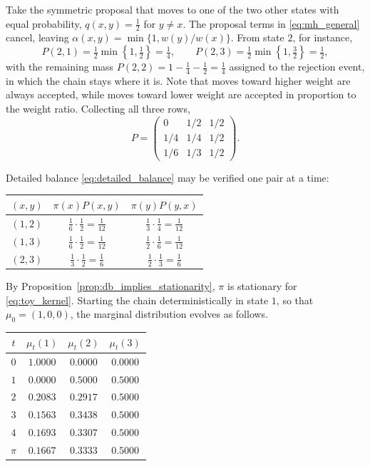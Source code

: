 \documentclass[11pt]{article}
\begin{document}
Take the symmetric proposal that moves to one of the two other states with equal
probability, $q(x,y)=\tfrac{1}{2}$ for $y\neq x$. The proposal terms in
\eqref{eq:mh_general} cancel, leaving $\alpha(x,y)=\min\{1,w(y)/w(x)\}$. From
state $2$, for instance,
\begin{equation*}
    P(2,1)=\tfrac{1}{2}\min\left\{1,\tfrac{1}{2}\right\}=\tfrac{1}{4},
    \qquad
    P(2,3)=\tfrac{1}{2}\min\left\{1,\tfrac{3}{2}\right\}=\tfrac{1}{2},
\end{equation*}
with the remaining mass $P(2,2)=1-\tfrac{1}{4}-\tfrac{1}{2}=\tfrac{1}{4}$
assigned to the rejection event, in which the chain stays where it is. Note that
moves toward higher weight are always accepted, while moves toward lower weight
are accepted in proportion to the weight ratio. Collecting all three rows,
\begin{equation}
    P=\begin{pmatrix}
        0 & 1/2 & 1/2\\
        1/4 & 1/4 & 1/2\\
        1/6 & 1/3 & 1/2
    \end{pmatrix}.
    \label{eq:toy_kernel}
\end{equation}

Detailed balance \eqref{eq:detailed_balance} may be verified one pair at a time:

\begin{center}
\begin{tabular}{ccc}
\toprule
$(x,y)$ & $\pi(x)P(x,y)$ & $\pi(y)P(y,x)$\\
\midrule
$(1,2)$ & $\tfrac{1}{6}\cdot\tfrac{1}{2}=\tfrac{1}{12}$
        & $\tfrac{1}{3}\cdot\tfrac{1}{4}=\tfrac{1}{12}$\\
$(1,3)$ & $\tfrac{1}{6}\cdot\tfrac{1}{2}=\tfrac{1}{12}$
        & $\tfrac{1}{2}\cdot\tfrac{1}{6}=\tfrac{1}{12}$\\
$(2,3)$ & $\tfrac{1}{3}\cdot\tfrac{1}{2}=\tfrac{1}{6}$
        & $\tfrac{1}{2}\cdot\tfrac{1}{3}=\tfrac{1}{6}$\\
\bottomrule
\end{tabular}
\end{center}

By Proposition~\ref{prop:db_implies_stationarity}, $\pi$ is stationary for
\eqref{eq:toy_kernel}. Starting the chain deterministically in state $1$, so
that $\mu_0=(1,0,0)$, the marginal distribution evolves as follows.

\begin{center}
\begin{tabular}{cccc}
\toprule
$t$ & $\mu_t(1)$ & $\mu_t(2)$ & $\mu_t(3)$\\
\midrule
$0$ & $1.0000$ & $0.0000$ & $0.0000$\\
$1$ & $0.0000$ & $0.5000$ & $0.5000$\\
$2$ & $0.2083$ & $0.2917$ & $0.5000$\\
$3$ & $0.1563$ & $0.3438$ & $0.5000$\\
$4$ & $0.1693$ & $0.3307$ & $0.5000$\\
\midrule
$\pi$ & $0.1667$ & $0.3333$ & $0.5000$\\
\bottomrule
\end{tabular}
\end{center}
\end{document}

